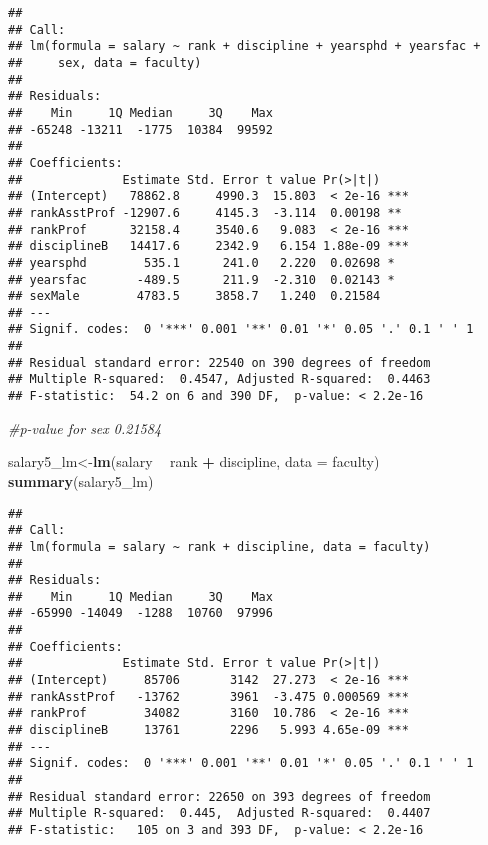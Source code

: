 \documentclass[]{article}
\newenvironment{Shaded}{\begin{snugshade}}{\end{snugshade}}
\newcommand{\KeywordTok}[1]{\textcolor[rgb]{0.13,0.29,0.53}{\textbf{#1}}}
\newcommand{\DataTypeTok}[1]{\textcolor[rgb]{0.13,0.29,0.53}{#1}}
\newcommand{\StringTok}[1]{\textcolor[rgb]{0.31,0.60,0.02}{#1}}
\newcommand{\CommentTok}[1]{\textcolor[rgb]{0.56,0.35,0.01}{\textit{#1}}}
\newcommand{\OperatorTok}[1]{\textcolor[rgb]{0.81,0.36,0.00}{\textbf{#1}}}
\newcommand{\NormalTok}[1]{#1}
\begin{document}
\begin{verbatim}
## 
## Call:
## lm(formula = salary ~ rank + discipline + yearsphd + yearsfac + 
##     sex, data = faculty)
## 
## Residuals:
##    Min     1Q Median     3Q    Max 
## -65248 -13211  -1775  10384  99592 
## 
## Coefficients:
##              Estimate Std. Error t value Pr(>|t|)    
## (Intercept)   78862.8     4990.3  15.803  < 2e-16 ***
## rankAsstProf -12907.6     4145.3  -3.114  0.00198 ** 
## rankProf      32158.4     3540.6   9.083  < 2e-16 ***
## disciplineB   14417.6     2342.9   6.154 1.88e-09 ***
## yearsphd        535.1      241.0   2.220  0.02698 *  
## yearsfac       -489.5      211.9  -2.310  0.02143 *  
## sexMale        4783.5     3858.7   1.240  0.21584    
## ---
## Signif. codes:  0 '***' 0.001 '**' 0.01 '*' 0.05 '.' 0.1 ' ' 1
## 
## Residual standard error: 22540 on 390 degrees of freedom
## Multiple R-squared:  0.4547, Adjusted R-squared:  0.4463 
## F-statistic:  54.2 on 6 and 390 DF,  p-value: < 2.2e-16
\end{verbatim}

\begin{Shaded}
\begin{Highlighting}[]
\CommentTok{#p-value for sex 0.21584}
\end{Highlighting}
\end{Shaded}

\begin{Shaded}
\begin{Highlighting}[]
\NormalTok{salary5_lm<-}\KeywordTok{lm}\NormalTok{(salary }\OperatorTok{~}\StringTok{ }\NormalTok{rank }\OperatorTok{+}\StringTok{ }\NormalTok{discipline, }\DataTypeTok{data =}\NormalTok{ faculty)}
\KeywordTok{summary}\NormalTok{(salary5_lm)}
\end{Highlighting}
\end{Shaded}

\begin{verbatim}
## 
## Call:
## lm(formula = salary ~ rank + discipline, data = faculty)
## 
## Residuals:
##    Min     1Q Median     3Q    Max 
## -65990 -14049  -1288  10760  97996 
## 
## Coefficients:
##              Estimate Std. Error t value Pr(>|t|)    
## (Intercept)     85706       3142  27.273  < 2e-16 ***
## rankAsstProf   -13762       3961  -3.475 0.000569 ***
## rankProf        34082       3160  10.786  < 2e-16 ***
## disciplineB     13761       2296   5.993 4.65e-09 ***
## ---
## Signif. codes:  0 '***' 0.001 '**' 0.01 '*' 0.05 '.' 0.1 ' ' 1
## 
## Residual standard error: 22650 on 393 degrees of freedom
## Multiple R-squared:  0.445,  Adjusted R-squared:  0.4407 
## F-statistic:   105 on 3 and 393 DF,  p-value: < 2.2e-16
\end{verbatim}
\end{document}
